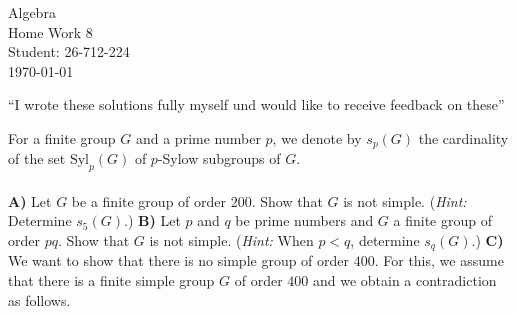 \documentclass[12pt,a4paper]{article}
\begin{document}
\begin{titlepage}
\centering
\vspace*{\fill}
{\Huge Algebra}\\[0.5cm]
{\Huge Home Work 8}\\[1.5cm]
{\Large Student: 26-712-224}\\[0.5cm]
{\Large \today}\par
\vspace{2cm}
{\normalsize ``I wrote these solutions fully myself und would like to receive feedback on these''\par}
\vspace*{\fill}
\end{titlepage}
\noindent For a finite group $G$ and a prime number $p$, we denote by $s_p(G)$ the cardinality of the set $\mathrm{Syl}_p(G)$ of $p$-Sylow subgroups of $G$.\\
\\
\noindent\textbf{A)} Let $G$ be a finite group of order $200$. Show that $G$ is not simple. (\textit{Hint:} Determine $s_5(G)$.)
\newpage
\noindent\textbf{B)} Let $p$ and $q$ be prime numbers and $G$ a finite group of order $pq$. Show that $G$ is not simple. (\textit{Hint:} When $p<q$, determine $s_q(G)$.)
\newpage
\noindent\textbf{C)} We want to show that there is no simple group of order $400$. For this, we assume that there is a finite simple group $G$ of order $400$ and we obtain a contradiction as follows.
\end{document}
